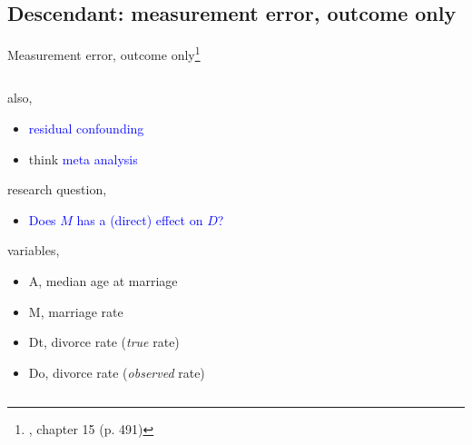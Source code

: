\subsection{Descendant: measurement error, outcome only}
%
%
\begin{frame}[t, negative]
	\subsectionpage
\end{frame}
%
%
\begin{frame}
	{Measurement error, outcome only\footnote{\citet{McElreath_2020}, chapter 15 (p. 491)}}
	\begin{columns}
		\begin{column}{0.5\textwidth}
			also, 
			\begin{itemize}
				\item \textcolor{blue}{residual confounding}
				\item think \textcolor{blue}{meta analysis}
			\end{itemize}
			
			research question, 
			\begin{itemize}
				\item \textcolor{blue}{Does $M$ has a (direct) effect on $D$?}
			\end{itemize}
			
			variables,
			\begin{itemize}
				\item A, median age at marriage
				\item M, marriage rate
				\item Dt, divorce rate (\textit{true} rate)
				\item Do, divorce rate (\textit{observed} rate)
			\end{itemize}
			

\end{column}
\end{columns}
\end{frame}

